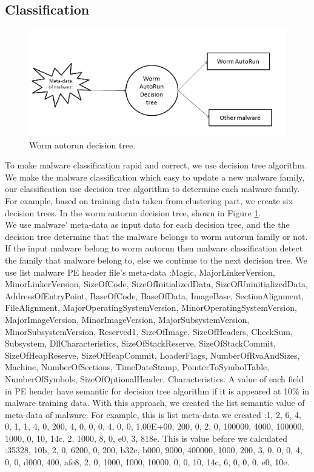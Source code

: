 \subsection{Classification}
\begin{figure}[h!]
\centering
\includegraphics[width=1\textwidth]{graph/classificationdecision.jpg}
\caption{Worm autorun decision tree.}
\label{fig:classificationdecision}
\end{figure}
To make malware classification rapid and correct, we use decision tree algorithm. We make the malware classification which easy to update a new malware family, our classification use decision tree algorithm to determine each malware family. For example, based on training data taken from clustering part, we create six decision trees. In the worm autorun decision tree, shown in Figure \ref{fig:classificationdecision}.\\
We use malware' meta-data as input data for each decision tree, and the the decision tree determine that the malware belongs to worm autorun family or not. If the input malware belong to worm autorun then malware classification detect the family that malware belong to, else we continue to the next decision tree. We use list malware PE header file's meta-data :Magic, MajorLinkerVersion, MinorLinkerVersion, SizeOfCode, SizeOfInitializedData, SizeOfUninitializedData, AddressOfEntryPoint, BaseOfCode, BaseOfData, ImageBase, SectionAlignment, FileAlignment, MajorOperatingSystemVersion, MinorOperatingSystemVersion, MajorImageVersion, MinorImageVersion, MajorSubsystemVersion, MinorSubsystemVersion, Reserved1, SizeOfImage, SizeOfHeaders, CheckSum, Subsystem, DllCharacteristics, SizeOfStackReserve, SizeOfStackCommit, SizeOfHeapReserve, SizeOfHeapCommit, LoaderFlags, NumberOfRvaAndSizes, Machine, NumberOfSections, TimeDateStamp, PointerToSymbolTable, NumberOfSymbols, SizeOfOptionalHeader, Characteristics. A value of each field in PE header have semantic for decision tree algorithm if it is appeared at 10\% in malware training data. With this approach, we created the list semantic value of meta-data of malware. For example, this is list meta-data we created :1, 2, 6, 4, 0, 1, 1, 4, 0, 200, 4, 0, 0, 0, 4, 0, 0, 1.00E+00, 200, 0, 2, 0, 100000, 4000, 100000, 1000, 0, 10, 14c, 2, 1000, 8, 0, e0, 3, 818e. This is value before we calculated :35328, 10b, 2, 0, 6200, 0, 200, b32e, b000, 9000, 400000, 1000, 200, 3, 0, 0, 0, 4, 0, 0, d000, 400, afe8, 2, 0, 1000, 1000, 10000, 0, 0, 10, 14c, 6, 0, 0, 0, e0, 10e. 
